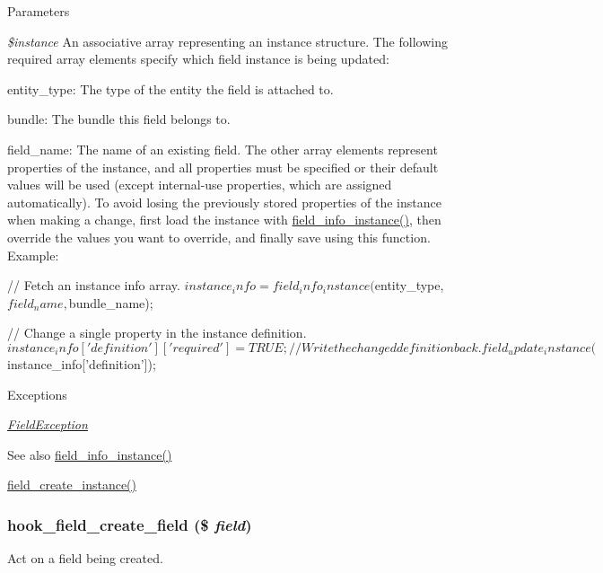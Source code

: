 \begin{DoxyParams}{Parameters}
\item[{\em \$instance}]An associative array representing an instance structure. The following required array elements specify which field instance is being updated:
\begin{DoxyItemize}
\item entity\_\-type: The type of the entity the field is attached to.
\item bundle: The bundle this field belongs to.
\item field\_\-name: The name of an existing field. The other array elements represent properties of the instance, and all properties must be specified or their default values will be used (except internal-\/use properties, which are assigned automatically). To avoid losing the previously stored properties of the instance when making a change, first load the instance with \hyperlink{group__field__info_ga7d4361ece7a9a8be980e3fd4a6307564}{field\_\-info\_\-instance()}, then override the values you want to override, and finally save using this function. Example: 
\begin{DoxyCode}
   // Fetch an instance info array.
   $instance_info = field_info_instance($entity_type, $field_name, $bundle_name);
      
   // Change a single property in the instance definition.
   $instance_info['definition']['required'] = TRUE;
   // Write the changed definition back.
   field_update_instance($instance_info['definition']);
\end{DoxyCode}

\end{DoxyItemize}\end{DoxyParams}

\begin{DoxyExceptions}{Exceptions}
\item[{\em \hyperlink{classFieldException}{FieldException}}]\end{DoxyExceptions}
\begin{DoxySeeAlso}{See also}
\hyperlink{group__field__info_ga7d4361ece7a9a8be980e3fd4a6307564}{field\_\-info\_\-instance()} 

\hyperlink{group__field__crud_ga3a1e23613d572a6e908e063c3a0335f8}{field\_\-create\_\-instance()} 
\end{DoxySeeAlso}
\hypertarget{group__field__crud_ga925648157864b55f553f5d2d31e2bf1b}{
\subsubsection[{hook\_\-field\_\-create\_\-field}]{\setlength{\rightskip}{0pt plus 5cm}hook\_\-field\_\-create\_\-field (\$ {\em field})}}
\label{group__field__crud_ga925648157864b55f553f5d2d31e2bf1b}
Act on a field being created.

